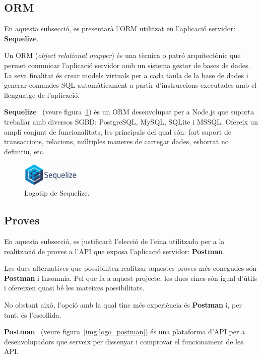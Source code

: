 \documentclass[a4paper,12pt]{ThesisStyle}
\begin{document}
\subsection{ORM}
\label{subsec:decisions_servidor_orm}

En aquesta subsecció, es presentarà l'ORM utilitzat en l'aplicació servidor: \textbf{Sequelize}.

Un ORM (\textit{object relational mapper}) és una tècnica o patró arquitectònic que permet comunicar l'aplicació servidor amb un sistema gestor de bases de dades. La seva finalitat és crear models virtuals per a cada taula de la base de dades i generar comandes SQL automàticament a partir d'instruccions executades amb el llenguatge de l'aplicació.

\textbf{Sequelize}~\cite{Sequelize} (veure figura~\ref{img:logo_sequelize}) és un ORM desenvolupat per a Node.js que suporta treballar amb diversos SGBD: PostgreSQL, MySQL, SQLite i MSSQL. Ofereix un ampli conjunt de funcionalitats, les principals del qual són: fort suport de transaccions, relacions, múltiples maneres de carregar dades, esborrat no definitiu, etc.

\begin{figure}[H]
  \centering
  \includegraphics[width=0.25\textwidth]{assets/logos/Sequelize.png}
  \caption{\label{img:logo_sequelize}Logotip de Sequelize.}
\end{figure}

\subsection{Proves}
\label{subsec:decisions_servidor_proves}

En aquesta subsecció, es justificarà l'elecció de l'eina utilitzada per a la realització de proves a l'API que exposa l'aplicació servidor: \textbf{Postman}.

Les dues alternatives que possibiliten realitzar aquestes proves més conegudes són \textbf{Postman} i Insomnia. Pel que fa a aquest projecte, les dues eines són igual d'útils i ofereixen quasi bé les mateixes possibilitats.

No obstant això, l'opció amb la qual tinc més experiència és \textbf{Postman} i, per tant, és l'escollida.

\textbf{Postman}~\cite{Postman} (veure figura~\ref{img:logo_postman}) és una plataforma d'API per a desenvolupadors que serveix per dissenyar i comprovar el funcionament de les API.
\end{document}

